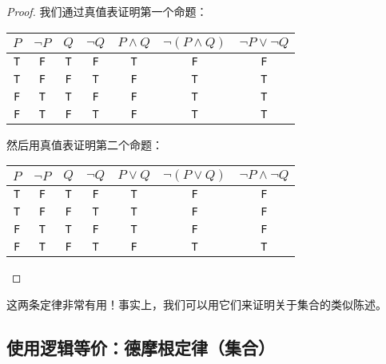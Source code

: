 \begin{proof}
    我们通过真值表证明第一个命题：
    \begin{center}
        \begin{tabular}{c|c|c|c|c|c|c}
              $P$      & $\neg P$ &   $Q$   &  $\neg Q$  & $P \land Q$ & $\neg (P \land Q)$ & $\neg P \lor \neg Q$ \\
              \hline
              \verb|T| & \verb|F| & \verb|T| &  \verb|F|  &    \verb|T|    &    \verb|F|   & \verb|F| \\
              \verb|T| & \verb|F| & \verb|F| &  \verb|T|  &    \verb|F|    &    \verb|T|   & \verb|T| \\
              \verb|F| & \verb|T| & \verb|T| &  \verb|F|  &    \verb|F|    &    \verb|T|   & \verb|T| \\
              \verb|F| & \verb|T| & \verb|F| &  \verb|T|  &    \verb|F|    &    \verb|T|   & \verb|T| \\
        \end{tabular}
    \end{center}
    
    然后用真值表证明第二个命题：
    \begin{center}
        \begin{tabular}{c|c|c|c|c|c|c}
              $P$      & $\neg P$ &   $Q$    &  $\neg Q$  & $P \lor Q$ & $\neg (P \lor Q)$ & $\neg P \land \neg Q$ \\
              \hline
              \verb|T| & \verb|F| & \verb|T| &  \verb|F|  &    \verb|T|    &    \verb|F|   & \verb|F| \\
              \verb|T| & \verb|F| & \verb|F| &  \verb|T|  &    \verb|T|    &    \verb|F|   & \verb|F| \\
              \verb|F| & \verb|T| & \verb|T| &  \verb|F|  &    \verb|T|    &    \verb|F|   & \verb|F| \\
              \verb|F| & \verb|T| & \verb|F| &  \verb|T|  &    \verb|F|    &    \verb|T|   & \verb|T| \\
        \end{tabular}
    \end{center}
\end{proof}

这两条定律非常有用！事实上，我们可以用它们来证明关于集合的类似陈述。

\subsection{使用逻辑等价：德摩根定律（集合）}\label{sec:section4.6.6}


